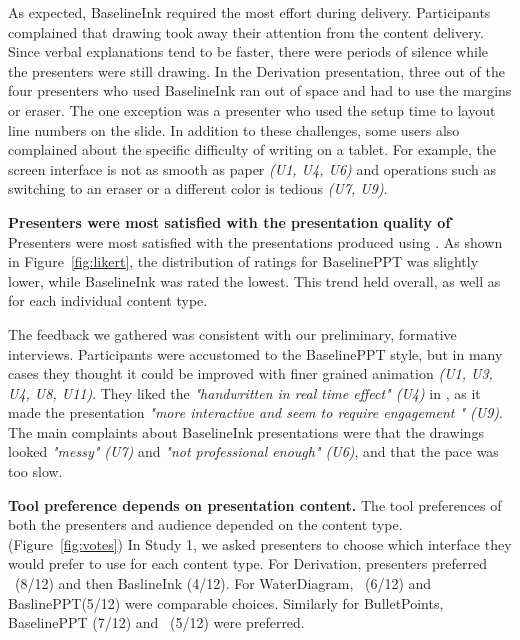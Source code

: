 As expected, BaselineInk required the most effort during delivery. Participants complained that drawing took away their attention from the content delivery. Since verbal explanations tend to be faster, there were periods of silence while the presenters were still drawing. In the Derivation presentation, three out of the four presenters who used BaselineInk ran out of space and had to use the margins or eraser. The one exception was a presenter who used the setup time to layout line numbers on the slide. In addition to these challenges, some users also complained about the specific difficulty of writing on a tablet. For example, the screen interface is not as smooth as paper \textit{(U1, U4, U6)} and operations such as switching to an eraser or a different color is tedious \textit{(U7, U9)}. 

\textbf{Presenters were most satisfied with the presentation quality of \interface\.}
Presenters were most satisfied with the presentations produced using \interface. As shown in Figure~\ref{fig:likert}, the distribution of ratings for BaselinePPT was slightly lower, while BaselineInk was rated the lowest.
%
%
This trend held overall, as well as for each individual content type.

The feedback we gathered was consistent with our preliminary, formative interviews. Participants were accustomed to the BaselinePPT style, but in many cases they thought it could be improved with finer grained animation \textit{(U1, U3, U4, U8, U11)}. They liked the \textit{"handwritten in real time effect" (U4)}   in \interface, as it made the presentation \textit{"more interactive and seem to require engagement " (U9)}. The main complaints about BaselineInk presentations were that the drawings looked \textit{"messy" (U7)} and \textit{"not professional enough" (U6)}, and that the pace was too slow.

\textbf{Tool preference depends on presentation content.}
The tool preferences of both the presenters and audience depended on the content type. (Figure~\ref{fig:votes})
%
In Study 1, we asked presenters to choose which interface they would prefer to use for each content type.
%
For Derivation, presenters preferred  \interface\ (8/12) and then BaslineInk (4/12). For WaterDiagram, \interface\ (6/12) and BaslinePPT(5/12) were comparable choices. Similarly for BulletPoints, BaselinePPT (7/12) and \interface\ (5/12) were preferred.
%


